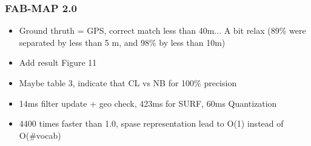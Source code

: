 \begin{frame}
    \frametitle{FAB-MAP 2.0}
    \begin{itemize}
        \item Ground thruth = GPS, correct match less than 40m... A bit relax (89\% were separated by less than 5 m, and 98\% by less than 10m)
        \item Add result Figure 11
        \item Maybe table 3, indicate that CL vs NB for 100\% precision
        \item 14ms filter update + geo check, 423ms for SURF, 60ms Quantization
        \item 4400 times faster than 1.0, spase representation lead to O(1) instead of O(\#vocab)
    \end{itemize}
\end{frame}


